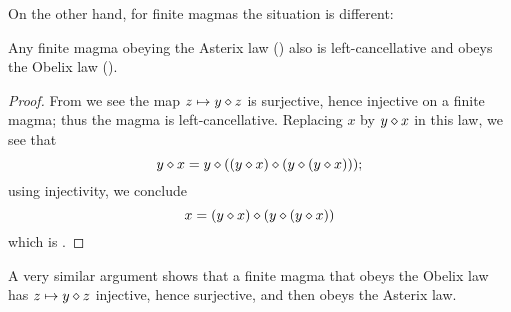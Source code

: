 On the other hand, for finite magmas the situation is different:

\begin{proposition}\label{asterix-obelix-finite}  Any finite magma obeying the Asterix law () also is left-cancellative and obeys the Obelix law ().
\end{proposition}

\begin{proof}  From  we see the map $z \mapsto y \diamond z$ is surjective, hence injective on a finite magma; thus the magma is left-cancellative.  Replacing $x$ by $y \diamond x$ in this law, we see that
$$ y \diamond x = y \diamond ((y\diamond x) \diamond (y \diamond (y \diamond x)));$$
using injectivity, we conclude
$$ x = (y\diamond x) \diamond (y \diamond (y \diamond x))$$
which is .
\end{proof}

A very similar argument shows that a finite magma that obeys the Obelix law has $z \mapsto y \diamond z$ injective, hence surjective, and then obeys the Asterix law.

